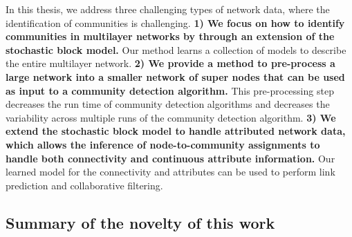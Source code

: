In this thesis, we address three challenging types of network data,  where the identification of communities is challenging. {\bf 1) We focus on how to identify communities in multilayer networks by through an extension of the stochastic block model.} Our method learns a collection of models to describe the entire multilayer network. {\bf 2) We provide a method to pre-process a large network into a smaller network of super nodes that can be used as input to a community detection algorithm.} This pre-processing step decreases the run time of community detection algorithms and decreases the variability across multiple runs of the community detection algorithm. {\bf 3) We extend the stochastic block model to handle attributed network data, which allows the inference of node-to-community assignments to handle both connectivity and continuous attribute information.} Our learned model for the connectivity and attributes can be used to perform link prediction and collaborative filtering.  

\subsection{Summary of the novelty of this work}

